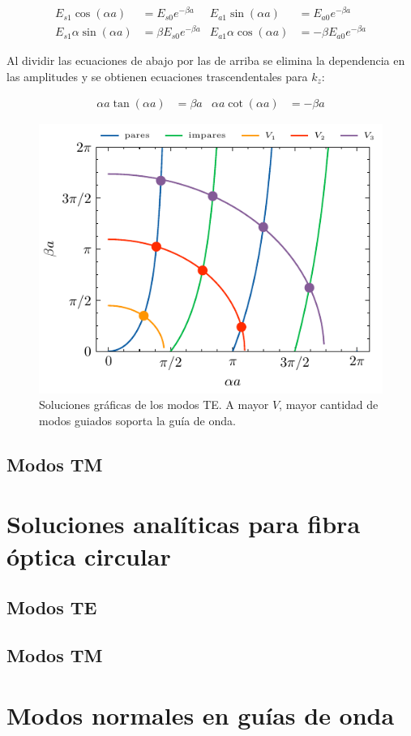 \begin{align*}
E_{s1}\cos(\alpha a) &= E_{s0} e^{-\beta a} & E_{a1}\sin(\alpha a) &= E_{a0} e^{-\beta a}
\\
E_{s1}\alpha\sin(\alpha a) &= \beta E_{s0} e^{-\beta a} & E_{a1}\alpha\cos(\alpha a) &= -\beta E_{a0} e^{-\beta a}
\end{align*}

Al dividir las ecuaciones de abajo por las de arriba se elimina la dependencia en las amplitudes y se obtienen ecuaciones trascendentales para $k_z$:

\begin{align*}
	\alpha a \tan(\alpha a) &= \beta a & \alpha a \cot(\alpha a) &= -\beta a
\end{align*}
\begin{figure}[H]
	\centering
	\includegraphics[width=0.7\linewidth]{media/slabgraphical}
	\caption[Soluciones gráficas de los modos TE]{Soluciones gráficas de los modos TE. A mayor $V$, mayor cantidad de modos guiados soporta la guía de onda.}
\end{figure}
\subsection{Modos TM}
\section{Soluciones analíticas para fibra óptica circular}
\subsection{Modos TE}
\subsection{Modos TM}
\section{Modos normales en guías de onda}

